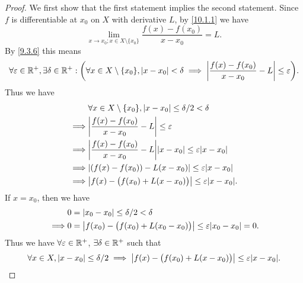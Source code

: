 \begin{proof}
  We first show that the first statement implies the second statement.
  Since \(f\) is differentiable at \(x_0\) on \(X\) with derivative \(L\), by \cref{10.1.1} we have
  \[
    \lim_{x \to x_0 ; x \in X \setminus \{x_0\}} \dfrac{f(x) - f(x_0)}{x - x_0} = L.
  \]
  By \cref{9.3.6} this means
  \[
    \forall \varepsilon \in \mathbb{R}^+, \exists \delta \in \mathbb{R}^+ : \bigg(\forall x \in X \setminus \{x_0\}, \left\lvert x - x_0\right\rvert < \delta \implies \left\lvert\dfrac{f(x) - f(x_0)}{x - x_0} - L\right\rvert \leq \varepsilon\bigg).
  \]
  Thus we have
  \begin{align*}
             & \forall x \in X \setminus \{x_0\}, \abs{x - x_0} \leq \delta / 2 < \delta             \\
    \implies & \abs{\dfrac{f(x) - f(x_0)}{x - x_0} - L} \leq \varepsilon                             \\
    \implies & \abs{\dfrac{f(x) - f(x_0)}{x - x_0} - L} \abs{x - x_0} \leq \varepsilon \abs{x - x_0} \\
    \implies & \abs{(f(x) - f(x_0)) - L(x - x_0)} \leq \varepsilon \abs{x - x_0}                     \\
    \implies & \abs{f(x) - \big(f(x_0) + L(x - x_0)\big)} \leq \varepsilon \abs{x - x_0}.
  \end{align*}
  If \(x = x_0\), then we have
  \begin{align*}
             & 0 = \abs{x_0 - x_0} \leq \delta / 2 < \delta                                             \\
    \implies & 0 = \abs{f(x_0) - \big(f(x_0) + L(x_0 - x_0)\big)} \leq \varepsilon \abs{x_0 - x_0} = 0.
  \end{align*}
  Thus we have \(\forall \varepsilon \in \mathbb{R}^+\), \(\exists \delta \in \mathbb{R}^+\) such that
  \[
    \forall x \in X, \abs{x - x_0} \leq \delta / 2 \implies \abs{f(x) - \big(f(x_0) + L(x - x_0)\big)} \leq \varepsilon \abs{x - x_0}.
  \]


\end{proof}
